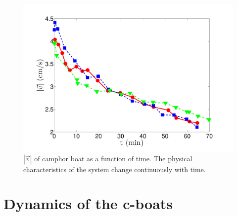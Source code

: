 \documentclass[12pt]{article}
\begin{document}
\begin{figure}[h]
    \begin{center}
       \includegraphics[scale=0.5]{cb_lifetime.pdf}
    \end{center}
    \caption{$|\vec{v}|$ of camphor boat as a function of time. The physical characteristics of the system change continuously with time.}
    \label{fig:cblife}
\end{figure}
\newpage
\section{Dynamics of the c-boats}
\end{document}
